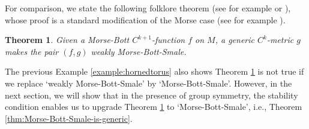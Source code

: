 \documentclass[11pt]{amsart}
\newtheorem{theorem}{Theorem}[section]
\theoremstyle{definition}
\numberwithin{equation}{subsection}
\DeclareMathOperator{\crit}{Crit}
\begin{document}
For comparison, we state the following folklore theorem (see for example \cite[ Section~6.2.1]{hutchings2002lecture} or \cite[Section 8]{ZhouMB}), whose proof is a standard modification of the Morse case (see for example \cite[Proposition~5.8]{hutchings2002lecture}).

\begin{theorem}\label{thm:weakMBS} 
    Given a Morse-Bott $C^{k+1}$-function $f$ on $M$, a generic $C^k$-metric $g$ makes the pair $(f,g)$ weakly Morse-Bott-Smale.
\end{theorem} 







The previous Example \ref{example:hornedtorus} also shows Theorem \ref{thm:weakMBS} is not true if we replace `weakly Morse-Bott-Smale' by `Morse-Bott-Smale'. However, in the next section, we will show that in the presence of group symmetry, the stability condition enables us to upgrade Theorem \ref{thm:weakMBS} to `Morse-Bott-Smale', i.e., Theorem \ref{thm:Morse-Bott-Smale-is-generic}.
\end{document}

